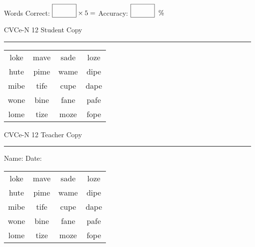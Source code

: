\documentclass{memoir}
\begin{document}
\small

Words Correct: $\fbox{\phantom{\huge 100}} \times 5 = $ Accuracy: $\fbox{\phantom{\huge 100}}\;\; \%$ 

\vfill

\newpage


\footnotesize \noindent
CVCe-N 12 \hfill Student Copy
\smallskip
\hrule

\Large

\setlength{\tabcolsep}{14pt}
\def\arraystretch{2}

{\selectfont


\begin{vplace}[0.5]
\begin{center}
\begin{tabular}{cccc}
loke & mave & sade & loze \\
hute & pime & wame & dipe \\
mibe & tife & cupe & dape \\
wone & bine & fane & pafe \\
lome & tize & moze & fope \\
\end{tabular}
\end{center}
\end{vplace}

}

\newpage

\footnotesize \noindent
CVCe-N 12 \hfill Teacher Copy
\smallskip
\hrule

\small

\vfill

\noindent
Name: \underline{\hspace{1.75in}} \hfill Date: \underline{\hspace{1in}}

\Large

{\selectfont


\begin{vplace}[0.5]
\begin{center}
\begin{tabular}{cccc}
loke & mave & sade & loze \\
hute & pime & wame & dipe \\
mibe & tife & cupe & dape \\
wone & bine & fane & pafe \\
lome & tize & moze & fope \\
\end{tabular}
\end{center}
\end{vplace}



}
\end{document}
